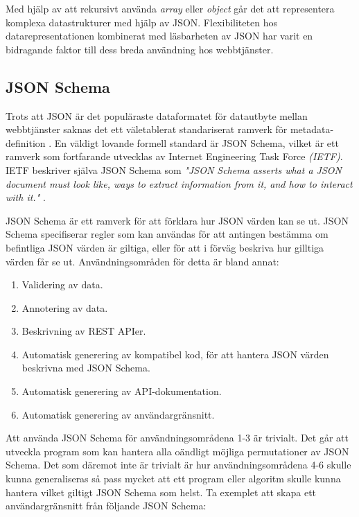 \documentclass[swedish]{kththesis}
\begin{document}
Med hjälp av att rekursivt använda \textit{array} eller \textit{object} går det att representera komplexa datastrukturer med hjälp av JSON. Flexibiliteten hos datarepresentationen kombinerat med läsbarheten av JSON har varit en bidragande faktor till dess breda användning hos webbtjänster.

\subsection{JSON Schema}
Trots att JSON är det populäraste dataformatet för datautbyte mellan webbtjänster saknas det ett väletablerat standariserat ramverk för metadata-definition \cite{Pezoa2016}. En väldigt lovande formell standard är JSON Schema, vilket är ett ramverk som fortfarande utvecklas av Internet Engineering Task Force \textit{(IETF)}. IETF beskriver själva JSON Schema som \textit{"JSON Schema asserts what a JSON document must look like, ways to extract information from it, and how to interact with it."} \cite{A.Wright}.

JSON Schema är ett ramverk för att förklara hur JSON värden kan se ut. JSON Schema specifiserar regler som kan användas för att antingen bestämma om befintliga JSON värden är giltiga, eller för att i förväg beskriva hur gilltiga värden får se ut. Användningsområden för detta är bland annat:


\begin{enumerate}
	\item Validering av data.
	\item Annotering av data.
	\item Beskrivning av REST APIer.
	\item Automatisk generering av kompatibel kod, för att hantera JSON värden beskrivna med JSON Schema.
	\item Automatisk generering av API-dokumentation.
	\item Automatisk generering av användargränsnitt.
\end{enumerate}



Att använda JSON Schema för användningsområdena 1-3 är trivialt. Det går att utveckla program som kan hantera alla oändligt möjliga permutationer av JSON Schema. Det som däremot inte är trivialt är hur användningsområdena 4-6 skulle kunna generaliseras så pass mycket att ett program eller algoritm skulle kunna hantera vilket giltigt JSON Schema som helst. Ta exemplet att skapa ett användargränsnitt från följande JSON Schema:
\end{document}
